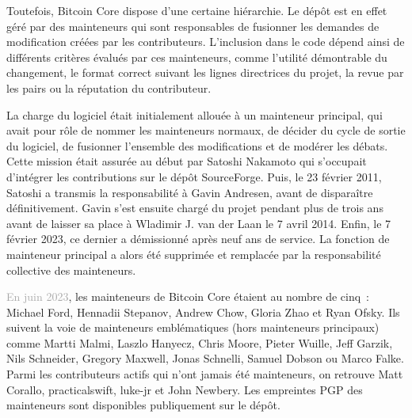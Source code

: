 Toutefois, Bitcoin Core dispose d'une certaine hiérarchie. Le dépôt est en effet géré par des mainteneurs qui sont responsables de fusionner les demandes de modification créées par les contributeurs. L'inclusion dans le code dépend ainsi de différents critères évalués par ces mainteneurs, comme l'utilité démontrable du changement, le format correct suivant les lignes directrices du projet, la revue par les pairs ou la réputation du contributeur. %

La charge du logiciel était initialement allouée à un mainteneur principal, qui avait pour rôle de nommer les mainteneurs normaux, de décider du cycle de sortie du logiciel, de fusionner l'ensemble des modifications et de modérer les débats. Cette mission était assurée au début par Satoshi Nakamoto qui s'occupait d'intégrer les contributions sur le dépôt SourceForge. Puis, le 23 février 2011, Satoshi a transmis la responsabilité à Gavin Andresen, avant de disparaître définitivement. Gavin s'est ensuite chargé du projet pendant plus de trois ans avant de laisser sa place à Wladimir J. van der Laan le 7 avril 2014. Enfin, le 7 février 2023, ce dernier a démissionné après neuf ans de service. La fonction de mainteneur principal a alors été supprimée et remplacée par la responsabilité collective des mainteneurs.

\textcolor{darkgray}{En juin 2023}, les mainteneurs de Bitcoin Core étaient au nombre de cinq~: Michael Ford, Hennadii Stepanov, Andrew Chow, Gloria Zhao et Ryan Ofsky. Ils suivent la voie de mainteneurs emblématiques (hors mainteneurs principaux) comme Martti Malmi, Laszlo Hanyecz, Chris Moore, Pieter Wuille, Jeff Garzik, Nils Schneider, Gregory Maxwell, Jonas Schnelli, Samuel Dobson ou Marco Falke. Parmi les contributeurs actifs qui n'ont jamais été mainteneurs, on retrouve Matt Corallo, practicalswift, luke-jr et John Newbery. Les empreintes PGP des mainteneurs sont disponibles publiquement sur le dépôt.

